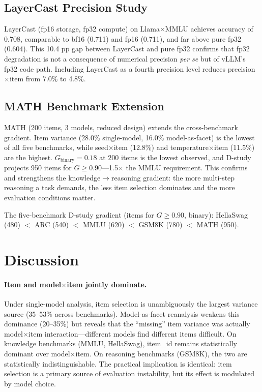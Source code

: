 \documentclass[letterpaper,11pt]{article}
\begin{document}
\subsection{LayerCast Precision Study}

LayerCast (fp16 storage, fp32 compute) on Llama$\times$MMLU achieves accuracy of 0.708, comparable to bf16 (0.711) and fp16 (0.711), and far above pure fp32 (0.604).
This 10.4 pp gap between LayerCast and pure fp32 confirms that fp32 degradation is not a consequence of numerical precision \emph{per se} but of vLLM's fp32 code path.
Including LayerCast as a fourth precision level reduces precision$\times$item from 7.0\% to 4.8\%.

\subsection{MATH Benchmark Extension}

MATH (200 items, 3 models, reduced design) extends the cross-benchmark gradient.
Item variance (28.0\% single-model, 16.0\% model-as-facet) is the lowest of all five benchmarks, while seed$\times$item (12.8\%) and temperature$\times$item (11.5\%) are the highest.
$G_\text{binary} = 0.18$ at 200 items is the lowest observed, and D-study projects 950 items for $G\geq0.90$---1.5$\times$ the MMLU requirement.
This confirms and strengthens the knowledge$\to$reasoning gradient: the more multi-step reasoning a task demands, the less item selection dominates and the more evaluation conditions matter.

The five-benchmark D-study gradient (items for $G\geq0.90$, binary): HellaSwag (480) $<$ ARC (540) $<$ MMLU (620) $<$ GSM8K (780) $<$ MATH (950).

\section{Discussion}

\paragraph{Item and model$\times$item jointly dominate.}
Under single-model analysis, item selection is unambiguously the largest variance source (35--53\% across benchmarks).
Model-as-facet reanalysis weakens this dominance (20--35\%) but reveals that the ``missing'' item variance was actually model$\times$item interaction---different models find different items difficult.
On knowledge benchmarks (MMLU, HellaSwag), item\_id remains statistically dominant over model$\times$item.
On reasoning benchmarks (GSM8K), the two are statistically indistinguishable.
The practical implication is identical: item selection is a primary source of evaluation instability, but its effect is modulated by model choice.
\end{document}
